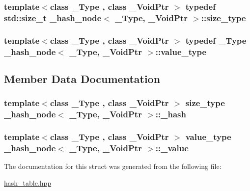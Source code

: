 \subsubsection[{size\+\_\+type}]{\setlength{\rightskip}{0pt plus 5cm}template$<$class \+\_\+\+Type , class \+\_\+\+Void\+Ptr $>$ typedef std\+::size\+\_\+t {\bf \+\_\+hash\+\_\+node}$<$ \+\_\+\+Type, \+\_\+\+Void\+Ptr $>$\+::{\bf size\+\_\+type}}\label{struct__hash__node_ab8640749cb597dcdad8e375118aea949}
\hypertarget{struct__hash__node_a9cf761f744b825cd8d029b23e987278e}{}
\subsubsection[{value\+\_\+type}]{\setlength{\rightskip}{0pt plus 5cm}template$<$class \+\_\+\+Type , class \+\_\+\+Void\+Ptr $>$ typedef \+\_\+\+Type {\bf \+\_\+hash\+\_\+node}$<$ \+\_\+\+Type, \+\_\+\+Void\+Ptr $>$\+::{\bf value\+\_\+type}}\label{struct__hash__node_a9cf761f744b825cd8d029b23e987278e}


\subsection{Member Data Documentation}
\hypertarget{struct__hash__node_a76441125881a6d5bf9366d60edf2f0ab}{}
\subsubsection[{\+\_\+hash}]{\setlength{\rightskip}{0pt plus 5cm}template$<$class \+\_\+\+Type , class \+\_\+\+Void\+Ptr $>$ {\bf size\+\_\+type} {\bf \+\_\+hash\+\_\+node}$<$ \+\_\+\+Type, \+\_\+\+Void\+Ptr $>$\+::\+\_\+hash}\label{struct__hash__node_a76441125881a6d5bf9366d60edf2f0ab}
\hypertarget{struct__hash__node_a5a7003f35790918c985be19c537cd464}{}
\subsubsection[{\+\_\+value}]{\setlength{\rightskip}{0pt plus 5cm}template$<$class \+\_\+\+Type , class \+\_\+\+Void\+Ptr $>$ {\bf value\+\_\+type} {\bf \+\_\+hash\+\_\+node}$<$ \+\_\+\+Type, \+\_\+\+Void\+Ptr $>$\+::\+\_\+value}\label{struct__hash__node_a5a7003f35790918c985be19c537cd464}


The documentation for this struct was generated from the following file\+:\begin{DoxyCompactItemize}
\item 
\hyperlink{hash__table_8hpp}{hash\+\_\+table.\+hpp}\end{DoxyCompactItemize}
